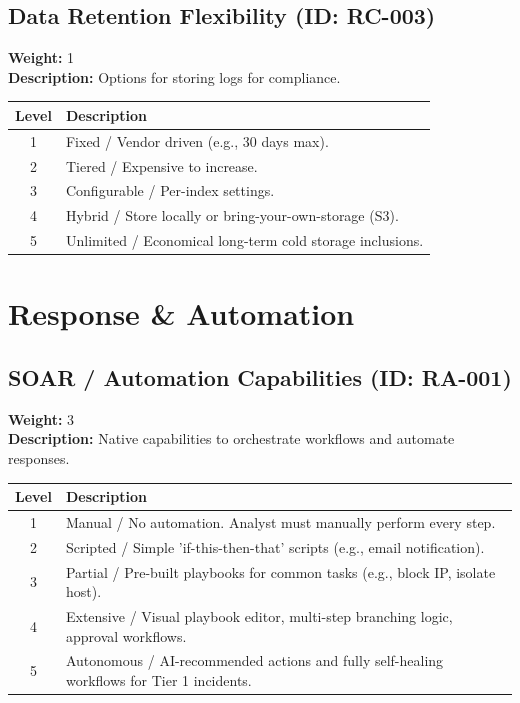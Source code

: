 \documentclass{article}
\begin{document}
\subsection{Data Retention Flexibility (ID: RC-003)}
\textbf{Weight:} 1 \\
\textbf{Description:} Options for storing logs for compliance.
\vspace{0.3cm}
\begin{longtable}{|c|p{12cm}|}
\hline
\rowcolor{lightgray} \textbf{Level} & \textbf{Description} \\ \hline
1 & Fixed / Vendor driven (e.g., 30 days max). \\ \hline
2 & Tiered / Expensive to increase. \\ \hline
3 & Configurable / Per-index settings. \\ \hline
4 & Hybrid / Store locally or bring-your-own-storage (S3). \\ \hline
5 & Unlimited / Economical long-term cold storage inclusions. \\ \hline
\end{longtable}
\vspace{0.5cm}
\section{Response \& Automation}
\subsection{SOAR / Automation Capabilities (ID: RA-001)}
\textbf{Weight:} 3 \\
\textbf{Description:} Native capabilities to orchestrate workflows and automate responses.
\vspace{0.3cm}
\begin{longtable}{|c|p{12cm}|}
\hline
\rowcolor{lightgray} \textbf{Level} & \textbf{Description} \\ \hline
1 & Manual / No automation. Analyst must manually perform every step. \\ \hline
2 & Scripted / Simple 'if-this-then-that' scripts (e.g., email notification). \\ \hline
3 & Partial / Pre-built playbooks for common tasks (e.g., block IP, isolate host). \\ \hline
4 & Extensive / Visual playbook editor, multi-step branching logic, approval workflows. \\ \hline
5 & Autonomous / AI-recommended actions and fully self-healing workflows for Tier 1 incidents. \\ \hline
\end{longtable}
\vspace{0.5cm}
\end{document}
